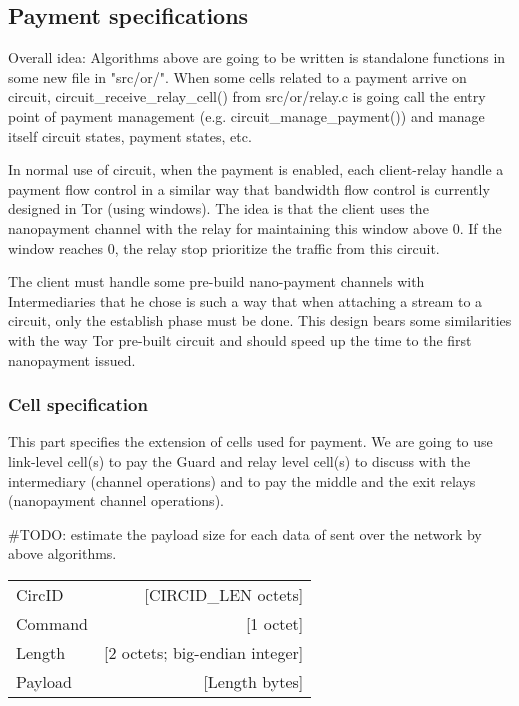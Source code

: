 \documentclass{article}
\begin{document}
\subsection{Payment specifications}
	\label{sec:payment_spec}

 Overall idea: Algorithms above are going to be written is standalone functions in some new file in "src/or/". When some cells related to a payment arrive on circuit, circuit\_receive\_relay\_cell() from src/or/relay.c is going call the entry point of payment management (e.g. circuit\_manage\_payment()) and manage itself circuit states, payment states, etc.

In normal use of circuit, when the payment is enabled, each client-relay handle a payment flow control in a similar way that bandwidth flow control is currently designed in Tor (using windows). The idea is that the client uses the nanopayment channel with the relay for maintaining this window above 0. If the window reaches 0, the relay stop prioritize the traffic from this circuit.

The client must handle some pre-build nano-payment channels with Intermediaries that he chose is such a way that when attaching a stream to a circuit, only the establish phase must be done. This design bears some similarities with the way Tor pre-built circuit and should speed up the time to the first nanopayment issued.
 \subsubsection{Cell specification}
 \label{sec:cell_spec}

 This part specifies the extension of cells used for payment. We are going to use link-level cell(s) to pay the Guard and relay level cell(s) to discuss with the intermediary (channel operations) and to pay the middle and the exit relays (nanopayment channel operations).

 \#TODO: estimate the payload size for each data of sent over the network by above algorithms.

 \begin{center}
 \begin{tabular}{l r}
        CircID        &                        [CIRCID\_LEN octets] \\
        Command       &                        [1 octet] \\
        Length        &                        [2 octets; big-endian integer]\\
        Payload       &                        [Length bytes]\\

\end{tabular}\\
 \end{center}
\end{document}
